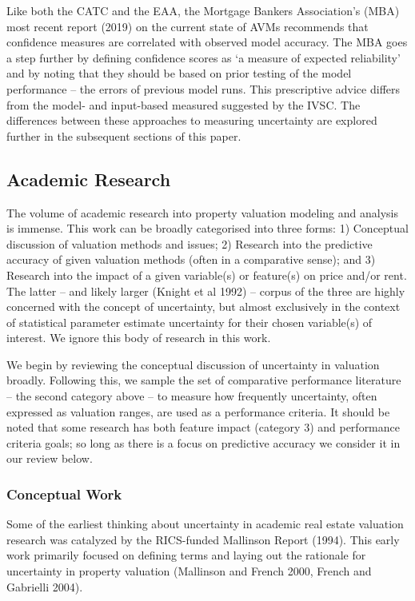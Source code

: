 \documentclass[colTwo]{format}
\theoremstyle{definition}
\begin{document}
Like both the CATC and the EAA, the Mortgage Bankers Association’s (MBA) most recent report (2019) on the current state of AVMs recommends that confidence measures are correlated with observed model accuracy.  The MBA goes a step further by defining confidence scores as ‘a measure of expected reliability’ and by noting that they should be based on prior testing of the model performance -- the errors of previous model runs.  This prescriptive advice differs from the model- and input-based measured suggested by the IVSC.  The differences between these approaches to measuring uncertainty are explored further in the subsequent sections of this paper.

\subsection{Academic Research}

The volume of academic research into property valuation modeling and analysis is immense.  This work can be broadly categorised into three forms: 1) Conceptual discussion of valuation methods and issues; 2) Research into the predictive accuracy of given valuation methods (often in a comparative sense); and  3) Research into the impact of a given variable(s) or feature(s) on price and/or rent.  The latter -- and likely larger (Knight et al 1992) -- corpus of the three are highly concerned with the concept of uncertainty, but almost exclusively in the context of statistical parameter estimate uncertainty for their chosen variable(s) of interest. We ignore this body of research in this work. 

We begin by reviewing the conceptual discussion of uncertainty in valuation broadly.  Following this, we sample the set of comparative performance literature -- the second category above -- to measure how frequently uncertainty, often expressed as valuation ranges, are used as a performance criteria. It should be noted that some research has both feature impact (category 3) and performance criteria goals; so long as there is a focus on predictive accuracy we consider it in our review below. 

\subsubsection{Conceptual Work}

Some of the earliest thinking about uncertainty in academic real estate valuation research was catalyzed by the RICS-funded Mallinson Report (1994).  This early work primarily focused on defining terms and laying out the rationale for uncertainty in property valuation (Mallinson and French 2000, French and Gabrielli 2004).
\end{document}
